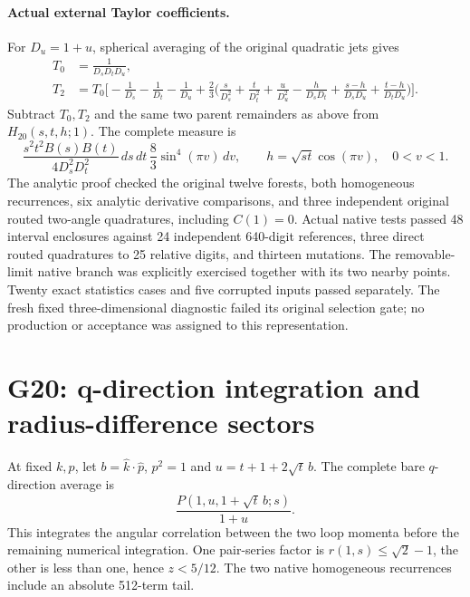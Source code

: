 \documentclass[11pt]{article}
\begin{document}
\paragraph{Actual external Taylor coefficients.}
For $D_u=1+u$, spherical averaging of the original quadratic jets gives
\begin{align*}
 T_0&=\frac1{D_sD_tD_u},\\
 T_2&=T_0\bigg[-\frac1{D_s}-\frac1{D_t}-\frac1{D_u}
 +\frac23\bigg(\frac{s}{D_s^2}+\frac{t}{D_t^2}+\frac{u}{D_u^2}
 -\frac{h}{D_sD_t}+\frac{s-h}{D_sD_u}+\frac{t-h}{D_tD_u}\bigg)\bigg].
\end{align*}
Subtract $T_0,T_2$ and the same two parent remainders as above from
$H_{20}(s,t,h;1)$. The complete measure is
\[
 \frac{s^2t^2B(s)B(t)}{4D_s^2D_t^2}\,ds\,dt\,
 \frac83\sin^4(\pi v)\,dv,\qquad
 h=\sqrt{st}\cos(\pi v),\quad0<v<1.
\]
The analytic proof checked the original twelve forests, both homogeneous
recurrences, six analytic derivative comparisons, and three independent
original routed two-angle quadratures, including $C(1)=0$.
Actual native tests passed 48 interval enclosures against 24 independent
640-digit references, three direct routed quadratures to 25 relative
digits, and thirteen mutations. The removable-limit native branch was
explicitly exercised together with its two nearby points. Twenty exact
statistics cases and five corrupted inputs passed separately.
The fresh fixed three-dimensional diagnostic failed its original selection
gate; no production or acceptance was assigned to this representation.

\section*{G20: q-direction integration and radius-difference sectors}
At fixed $k,p$, let $b=\widehat k\cdot\widehat p$, $p^2=1$ and
$u=t+1+2\sqrt t\,b$. The complete bare $q$-direction average is
\[
 \frac{P(1,u,1+\sqrt t\,b;s)}{1+u}.
\]
This integrates the angular correlation between the two loop momenta
before the remaining numerical integration. One pair-series factor is
$r(1,s)\leq\sqrt2-1$, the other is less than one, hence $z<5/12$.
The two native homogeneous recurrences include an absolute 512-term tail.
\end{document}
